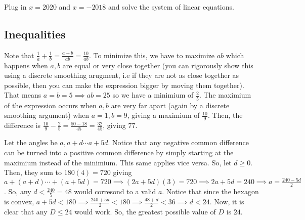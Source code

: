 \documentclass[11pt]{article}
\begin{document}
\begin{sol}
Plug in $x=2020$ and $x=-2018$ and solve the system of linear equations.
\end{sol}

\subsection{Inequalities}

\begin{sol}
Note that $\frac{1}{a}+\frac{1}{b}=\frac{a+b}{ab}=\frac{10}{ab}$. To minimize this, we have to maximize $ab$ which happens when $a,b$ are equal or very close together (you can rigorously show this using a discrete smoothing arugment, i.e if they are not as close together as possible, then you can make the expression bigger by moving them together). That means $a=b=5\implies ab=25$ so we have a minimium of $\frac{2}{5}$. The maximium of the expression occurs when $a,b$ are very far apart (again by a discrete smoothing argument) when $a=1, b=9$, giving a maximium of $\frac{10}{9}$. Then, the difference is $\frac{10}{9}-\frac{2}{5}=\frac{50-18}{45}=\frac{32}{45}$, giving $\boxed{77}$.
\end{sol}


\begin{sol}
Let the angles be $a,a+d\cdots a+5d$.  Notice that any negative common difference can be turned into a positive common difference by simply starting at the maximium instead of the minimium. This same applies vice versa. So, let $d\ge 0$. Then, they sum to $180(4)=720$ giving $a+(a+d)\cdots + (a+5d)=720\implies (2a+5d)(3)=720\implies 2a+5d=240\implies a =\frac{240-5d}{2}$. So, any $d<\frac{240}{5}=48$ would corresond to a valid $a$. Notice that since the hexagon is convex, $a+5d<180\implies \frac{240+5d}{2} < 180 \implies \frac{48+d}{2} < 36\implies d < 24$. Now, it is clear that any $D\leq 24$ would work. So, the greatest possible value of $D$ is $\boxed{24}$.
\end{sol}
\end{document}
